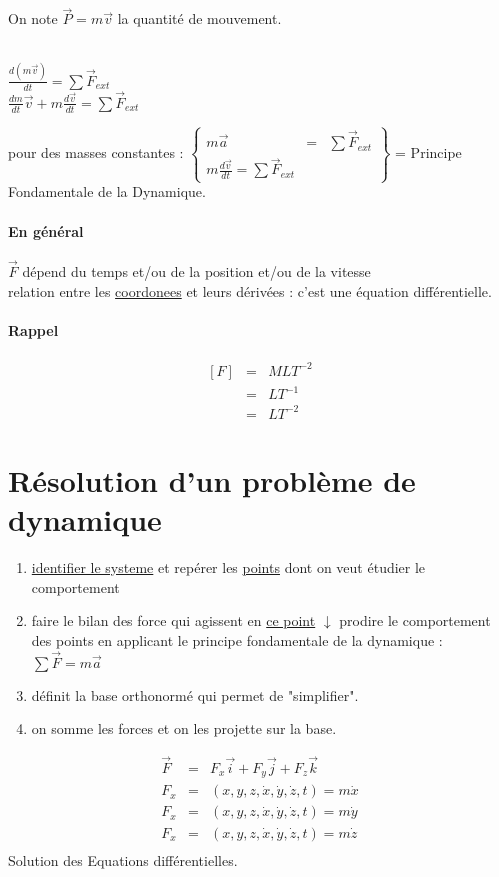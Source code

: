 On note $\vec{P}=m\vec{v}$ la quantité de mouvement.

 ~\\
$\frac{d(m\vec{v})}{dt}=\sum\vec{F}_{ext}$ ~\\
$\frac{dm}{dt}\vec{v}+m\frac{d\vec{v}}{dt}=\sum\vec{F}_{ext}$

pour des masses constantes : $\left\{ \begin{array}{rcl}
		m\vec{a} &=& \sum\vec{F}_{ext} \\
		m\frac{d\vec{v}}{dt}=\sum\vec{F}_{ext}
	\end{array}\right\} $ = Principe Fondamentale de la Dynamique.

	\paragraph{En général} $\vec{F}$ dépend du temps et/ou de la position et/ou de la vitesse ~\\
	 relation entre les \ul{coordonees} et leurs dérivées : c'est une équation différentielle.

	\paragraph{Rappel} \[\begin{array}{rcl}
			[F] &=& MLT^{-2} \\
			[\vec{v}] &=& LT^{-1} \\
			[\vec{a}] &=& LT^{-2}
	\end{array}\]

	\section{Résolution d'un problème de dynamique}

	\begin{enumerate}
		\item \ul{identifier le systeme} et repérer les \ul{points} dont on veut étudier le comportement
		\item faire le bilan des force qui agissent en \ul{ce point} $\downarrow$ prodire le comportement des points en applicant le principe fondamentale de la dynamique : $\sum\vec{F}=m\vec{a}$
		\item définit la base orthonormé qui permet de "simplifier".
		\item on somme les forces et on les projette sur la base.
	\end{enumerate}

	\[\begin{array}{rcl}
			\vec{F}&=&F_x\vec{i}+F_y\vec{j}+F_z\vec{k} \\
			F_x&=&(x, y, z, \dot{x}, \dot{y}, \dot{z}, t) = m\dot{x} \\
			F_x&=&(x, y, z, \dot{x}, \dot{y}, \dot{z}, t) = m\dot{y} \\
			F_x&=&(x, y, z, \dot{x}, \dot{y}, \dot{z}, t) = m\dot{z} \\
	\end{array}\]
	Solution des Equations différentielles.
